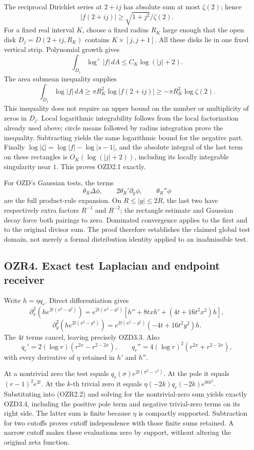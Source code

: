 The reciprocal Dirichlet series at \(2+ij\) has absolute sum at most
\(\zeta(2)\); hence \[
|f(2+ij)|\ge\sqrt{1+j^2}/\zeta(2).
\tag{OZR3.2}
\] For a fixed real interval \(K\), choose a fixed radius \(R_K\) large
enough that the open disk \(D_j=D(2+ij,R_K)\) contains
\(K\times[j,j+1]\). All these disks lie in one fixed vertical strip.
Polynomial growth gives \[
\int_{D_j}\log^+|f|\,dA\le C_K\log(|j|+2).
\] The area submean inequality supplies \[
\int_{D_j}\log|f|\,dA
\ge\pi R_K^2\log|f(2+ij)|\ge-\pi R_K^2\log\zeta(2).
\] This inequality does not require an upper bound on the number or
multiplicity of zeros in \(D_j\). Local logarithmic integrability
follows from the local factorization already used above; circle means
followed by radius integration prove the inequality. Subtracting yields
the same logarithmic bound for the negative part. Finally
\(\log|\zeta|=\log|f|-\log|s-1|\), and the absolute integral of the last
term on these rectangles is \(O_K(\log(|j|+2))\), including its locally
integrable singularity near \(1\). This proves OZD2.1 exactly.

For OZD's Gaussian tests, the terms \[
\theta_R\Delta\phi,\qquad 2\theta_R'\partial_y\phi,
\qquad \theta_R''\phi
\] are the full product-rule expansion. On \(R\le|y|\le2R\), the last
two have respectively extra factors \(R^{-1}\) and \(R^{-2}\); the
rectangle estimate and Gaussian decay force both pairings to zero.
Dominated convergence applies to the first and to the original divisor
sum. The proof therefore establishes the claimed global test domain, not
merely a formal distribution identity applied to an inadmissible test.

\subsection{OZR4. Exact test Laplacian and endpoint
receiver}\label{ozr4.-exact-test-laplacian-and-endpoint-receiver}

Write \(h=\eta q_r\). Direct differentiation gives \[
\partial_x^2(he^{2t(x^2-y^2)})
=e^{2t(x^2-y^2)}[h''+8txh'+(4t+16t^2x^2)h],
\] \[
\partial_y^2(he^{2t(x^2-y^2)})
=e^{2t(x^2-y^2)}(-4t+16t^2y^2)h.
\] The \(4t\) terms cancel, leaving precisely OZD3.3. Also \[
q_r'=2(\log r)(r^{2x}-r^{2-2x}),\qquad
q_r''=4(\log r)^2(r^{2x}+r^{2-2x}),
\] with every derivative of \(\eta\) retained in \(h'\) and \(h''\).

At a nontrivial zero the test equals
\(q_r(\sigma)e^{2t(\sigma^2-\gamma^2)}\). At the pole it equals
\((r-1)^2e^{2t}\). At the \(k\)-th trivial zero it equals
\(\eta(-2k)q_r(-2k)e^{8tk^2}\). Substituting into (OZR2.2) and solving
for the nontrivial-zero sum yields exactly OZD3.4, including the
positive pole term and negative trivial-zero terms on its right side.
The latter sum is finite because \(\eta\) is compactly supported.
Subtraction for two cutoffs proves cutoff independence with those finite
sums retained. A narrow cutoff makes these evaluations zero by support,
without altering the original zeta function.

